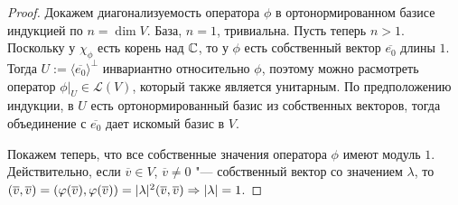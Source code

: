 \begin{proof}
	Докажем диагонализуемость оператора $\phi$ в ортонормированном базисе индукцией по $n = \dim{V}$. База, $n = 1$, тривиальна. Пусть теперь $n > 1$. Поскольку у $\chi_\phi$ есть корень над $\mathbb{C}$, то у $\phi$ есть собственный вектор $\overline{e_0}$ длины $1$. Тогда $U := \langle\overline{e_0}\rangle^\perp$ инвариантно относительно $\phi$, поэтому можно расмотреть оператор $\phi|_{U} \in \mathcal{L}(V)$, который также является унитарным. По предположению индукции, в $U$ есть ортонормированный базис из собственных векторов, тогда объединение с $\overline{e_0}$ дает искомый базис в $V$.
	
	Покажем теперь, что все собственные значения оператора $\phi$ имеют модуль $1$. Действительно, если $\overline{v} \in V$, $\overline{v} \ne 0$ "--- собственный вектор со значением $\lambda$, то $(\overline{v}, \overline{v}) = (\phi(\overline{v}), \phi(\overline{v})) \hm= |\lambda|^2(\overline{v}, \overline{v}) \Rightarrow |\lambda| = 1$.
\end{proof}